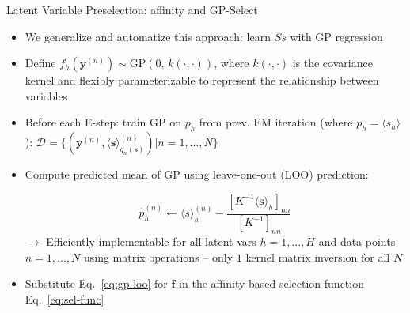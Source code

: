 \documentclass[final]{beamer}
\renewcommand{\vec}[1]{{\mathbf{#1}}}
\newcommand{\highlight}[1]{\textcolor{blocktbgn}{#1}}
\renewcommand{\vec}[1]{{\mathbf{#1}}}
\newcommand{\Ss}{\mathcal{S}}
\begin{document}
\begin{frame}{}
\begin{columns}[t]
\begin{column}{.35\linewidth}
\begin{block}{Latent Variable Preselection: affinity and GP-Select}
\begin{itemize}
            \item We \highlight{generalize and automatize} this approach:  %
                \highlight{learn $Ss$} with \highlight{GP regression} %
            \item Define $f_h(\vec{y}^{(n)}) \sim \text{GP}\left(0, \, k(\cdot,\cdot) \right)$, where $k(\cdot, \cdot)$ is the covariance kernel and flexibly parameterizable to represent the relationship between variables

            \item Before each E-step: 
                \highlight{train GP on $p_h$ from prev. EM iteration} (where $p_h = \langle s_h \rangle$): 
            $\mathcal{D} = \{ (\vec{y}^{(n)}, \langle\vec{s}\rangle^{(n)}_{q_n(\vec{s})}) | n = 1,\dots, N \}$

            \item \highlight{Compute} predicted mean of GP using \highlight{leave-one-out (LOO) prediction}:

                \vspace{-.6cm}  %
                \begin{equation}\label{eq:gp-loo}
                \hat{p}_{h}^{(n)} \leftarrow   
                \langle s \rangle_h^{(n)} - \frac{ [ K^{-1} \langle\vec{s}\rangle_{h} ]_{nn} }{ [ K^{-1} ]_{nn} }
                \end{equation}
                \vspace{.4cm}
                \highlight{$\rightarrow$ Efficiently implementable} for all latent vars $h=1,...,H$ and data points $n=1,...,N$ using matrix operations -- only $1$ kernel matrix inversion for all $N$
            \item \highlight{Substitute} Eq.~\eqref{eq:gp-loo} for $\vec{f}$ in the affinity based selection function Eq.~\eqref{eq:sel-func} %


\end{itemize}
\end{block}
\end{column}
\end{columns}
\end{frame}
\end{document}
